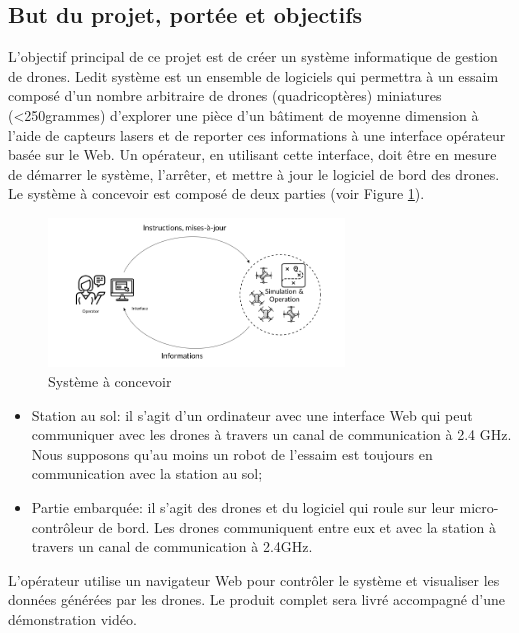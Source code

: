 \documentclass{mistcoursedoc}
\begin{document}
\subsection{But du projet, portée et objectifs}

\par L'objectif principal de ce projet est de créer un système informatique de gestion de drones.
Ledit système est un ensemble de logiciels qui permettra à un essaim composé d’un nombre arbitraire de drones (quadricoptères) miniatures (<250grammes) d’explorer une pièce d’un bâtiment de moyenne dimension à l'aide de capteurs lasers et de reporter ces informations à une interface opérateur basée sur le Web. 
Un opérateur, en utilisant cette interface, doit être en mesure de démarrer le système, l’arrêter, et mettre à jour le logiciel de bord des drones. Le système à concevoir est composé de deux parties (voir Figure \ref{fig:systeme}).

\begin{figure}[h!]
  \centering\includegraphics[width=0.7\textwidth]{systeme.png}
  \caption{Système à concevoir}
  \label{fig:systeme}
\end{figure}

\begin{itemize}
    \item Station au sol: il s’agit d’un ordinateur avec une interface Web qui peut communiquer avec les drones à travers un canal de communication à 2.4 GHz. Nous supposons qu’au moins un robot de l’essaim est toujours en communication avec la station au sol;
    \item Partie embarquée: il s’agit des drones et du logiciel qui roule sur leur micro-contrôleur de bord. Les drones communiquent entre eux et avec la station à travers un canal de communication à 2.4GHz. 
\end{itemize}

L’opérateur utilise un navigateur Web pour contrôler le système et visualiser les données générées par les drones. Le produit complet sera livré accompagné d’une démonstration vidéo.
\end{document}
